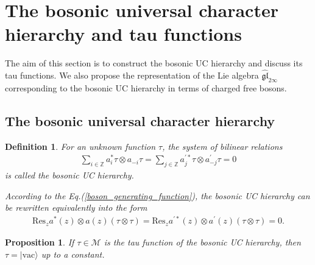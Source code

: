 \documentclass[11pt,reqno]{amsart}
\numberwithin{equation}{section}
\newtheorem{definition}[theorem]{Definition}
\newtheorem{proposition}[theorem]{Proposition}
\begin{document}
\section{The bosonic universal character hierarchy and tau functions}
The aim of this section is to construct the bosonic UC hierarchy  and discuss its tau functions.  We also propose the representation of the Lie algebra $\mathfrak{\widehat{gl}}_{2\infty}$ corresponding to the bosonic UC hierarchy in terms of charged free bosons.

\subsection{The bosonic universal character hierarchy}
\begin{definition}
For an unknown function $\tau$, the system of bilinear relations
\begin{eqnarray}\label{bosoc_uc_hierarchy}
\sum\limits_{i\in\mathbb{Z}}a^{\ast}_{i}\tau\otimes a_{-i}\tau=\sum\limits_{j\in\mathbb{Z}}a^{\prime\ast}_{j}\tau\otimes a^{\prime}_{-j}\tau=0
\end{eqnarray}
is called the bosonic UC hierarchy.

According to the Eq.(\ref{boson_generating_function}), the bosonic UC hierarchy can be rewritten equivalently into the form
\begin{eqnarray}
\text{Res}_{z}a^{\ast}(z)\otimes a(z)(\tau\otimes\tau)=\text{Res}_{z}a^{\prime\ast}(z)\otimes a^{\prime}(z)(\tau\otimes\tau)=0.
\end{eqnarray}
\end{definition}



\begin{proposition}\label{vac_solution}
If $\tau\in\mathcal{M}$ is the tau function of the bosonic UC hierarchy, then $\tau=|\text{vac}\rangle$ up to a constant.
\end{proposition}
\end{document}
